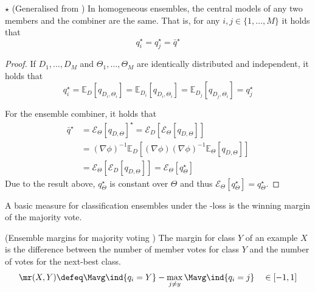 \documentclass[
	twoside=false, %
]{kaobook}
\begin{document}
\begin{lemma}
 \label{thm:qstars-same} 
  $\star$ (Generalised from \cite{louppe_UnderstandingRandomForests_2015}) In homogeneous ensembles, the central models of any two members and the combiner are the same. That is, for any $i, j \in \{ 1, \dots, M \}$ it holds that
$$
q_{i}^\star = q_{j}^\star = \bar{q}^\star
$$
\end{lemma}
\begin{proof}
If $D_{1}, \dots, D_{M}$ and $\Theta_{1}, \dots, \Theta_{M}$ are identically distributed and independent, it holds that
$$
q_{i}^\star = \mathbb{E}_{D}\left[ q_{D_{i}, \Theta_{i}} \right]  = \mathbb{E}_{D_{i}}\left[ q_{D_{i}, \Theta_{i}} \right]  
= \mathbb{E}_{D_{j}}\left[ q_{D_{j}, \Theta_{i}} \right] = q_{j}^\star
$$

For the ensemble combiner, it holds that 
\begin{align*}
\bar{q}^\star &= \mathcal{E}_{\Theta}\left[ q_{D,\Theta} \right] ^\star = \mathcal{E}_{D}\left[ \mathcal{E}_{\Theta}\left[ q_{D,\Theta} \right]   \right] \\
&= (\nabla \phi)^{-1} \mathbb{E}_{D}\left[ (\nabla \phi) (\nabla \phi)^{-1} \mathbb{E}_{\Theta}\left[ q_{D,\Theta} \right]   \right] \\
&= \mathcal{E}_{\Theta}\left[ \mathcal{E}_{D}\left[ q_{D, \Theta} \right]  \right] = \mathcal{E}_{\Theta}\left[ q_{\Theta}^\star \right] 
\end{align*}
Due to the result above, $q_{\Theta}^\star$ is constant over $\Theta$ and thus $\mathcal{E}_{\Theta}\left[ q_{\Theta}^\star \right] = q_{\Theta}^\star$.
\end{proof}

A basic measure for classification ensembles under the \zeroone-loss is the winning margin of the majority vote.
\begin{definition} (Ensemble margins for majority voting \cite{breiman_RandomForests_2001})
The margin for class $Y$ of an example $X$ is the difference between the number of member votes for class $Y$ and the number of votes for the next-best class.
	$$
\mr(X,Y) \defeq \Mavg \ind{q_{i} = Y} - \max_{j \neq y} \Mavg \ind{q_{i} = j} \hspace{1em} \in [-1, 1]
$$
\label{def:ensemble-margin}
\end{definition}
\end{document}
